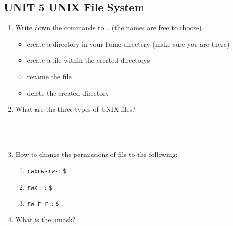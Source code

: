 \documentclass[11pt]{article}
\begin{document}
\newpage
\subsection*{UNIT 5 UNIX File System}
\begin{enumerate}
    \item Write down the commands to... (the names are free to choose)
    \begin{itemize}
        \item create a directory in your home-directory (make sure you are there)
        \item create a file within the created directorys
        \item rename the file
        \item delete the created directory
    \end{itemize}
    \item What are the three types of UNIX files? \\
    \\
    \\
    \\
    \item How to change the permissions of file to the following:
    \begin{enumerate}
        \item \texttt{rwxrw-rw-}: \texttt{\$}
        \item \texttt{rwx------}: \texttt{\$}
        \item \texttt{rw-r--r--}: \texttt{\$}
    \end{enumerate}
    \item What is the umask? \\
    \\
    \\
\end{enumerate}

\newpage
\end{document}
